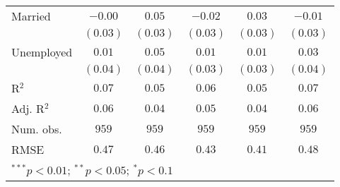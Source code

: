 \begin{table}
\begin{center}
\begin{tabular}{l c c c c c}
Married              & $-0.00$       & $0.05$        & $-0.02$       & $0.03$        & $-0.01$       \\
                     & $(0.03)$      & $(0.03)$      & $(0.03)$      & $(0.03)$      & $(0.03)$      \\
Unemployed           & $0.01$        & $0.05$        & $0.01$        & $0.01$        & $0.03$        \\
                     & $(0.04)$      & $(0.04)$      & $(0.03)$      & $(0.03)$      & $(0.04)$      \\
\midrule
R$^2$                & $0.07$        & $0.05$        & $0.06$        & $0.05$        & $0.07$        \\
Adj. R$^2$           & $0.06$        & $0.04$        & $0.05$        & $0.04$        & $0.06$        \\
Num. obs.            & $959$         & $959$         & $959$         & $959$         & $959$         \\
RMSE                 & $0.47$        & $0.46$        & $0.43$        & $0.41$        & $0.48$        \\
\bottomrule
\multicolumn{6}{l}{\scriptsize{$^{***}p<0.01$; $^{**}p<0.05$; $^{*}p<0.1$}}
\end{tabular}
\label{tab_emo}
\end{center}
\end{table}
